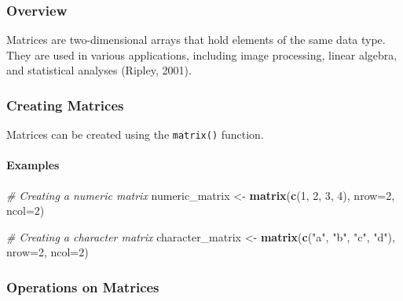 \documentclass[
  b5paper]{book}
\newenvironment{Shaded}{\begin{snugshade}}{\end{snugshade}}
\newcommand{\AttributeTok}[1]{\textcolor[rgb]{0.13,0.29,0.53}{#1}}
\newcommand{\CommentTok}[1]{\textcolor[rgb]{0.56,0.35,0.01}{\textit{#1}}}
\newcommand{\DecValTok}[1]{\textcolor[rgb]{0.00,0.00,0.81}{#1}}
\newcommand{\FunctionTok}[1]{\textcolor[rgb]{0.13,0.29,0.53}{\textbf{#1}}}
\newcommand{\NormalTok}[1]{#1}
\newcommand{\OtherTok}[1]{\textcolor[rgb]{0.56,0.35,0.01}{#1}}
\newcommand{\StringTok}[1]{\textcolor[rgb]{0.31,0.60,0.02}{#1}}
\begin{document}
\hypertarget{overview-3}{%
\subsubsection*{Overview}\label{overview-3}}

Matrices are two-dimensional arrays that hold elements of the same data type. They are used in various applications, including image processing, linear algebra, and statistical analyses (Ripley, 2001).

\hypertarget{creating-matrices}{%
\subsubsection*{Creating Matrices}\label{creating-matrices}}

Matrices can be created using the \texttt{matrix()} function.

\hypertarget{examples-3}{%
\paragraph*{Examples}\label{examples-3}}

\begin{Shaded}
\begin{Highlighting}[]
\CommentTok{\# Creating a numeric matrix}
\NormalTok{numeric\_matrix }\OtherTok{\textless{}{-}} \FunctionTok{matrix}\NormalTok{(}\FunctionTok{c}\NormalTok{(}\DecValTok{1}\NormalTok{, }\DecValTok{2}\NormalTok{, }\DecValTok{3}\NormalTok{, }\DecValTok{4}\NormalTok{), }\AttributeTok{nrow=}\DecValTok{2}\NormalTok{, }\AttributeTok{ncol=}\DecValTok{2}\NormalTok{)}

\CommentTok{\# Creating a character matrix}
\NormalTok{character\_matrix }\OtherTok{\textless{}{-}} \FunctionTok{matrix}\NormalTok{(}\FunctionTok{c}\NormalTok{(}\StringTok{"a"}\NormalTok{, }\StringTok{"b"}\NormalTok{, }\StringTok{"c"}\NormalTok{, }\StringTok{"d"}\NormalTok{), }\AttributeTok{nrow=}\DecValTok{2}\NormalTok{, }\AttributeTok{ncol=}\DecValTok{2}\NormalTok{)}
\end{Highlighting}
\end{Shaded}

\hypertarget{operations-on-matrices}{%
\subsubsection*{Operations on Matrices}\label{operations-on-matrices}}
\end{document}

